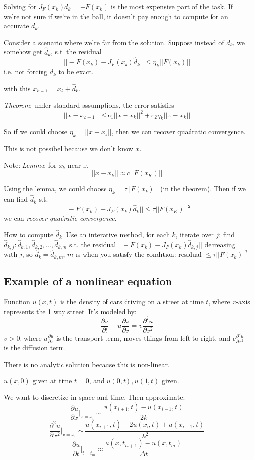 Solving for $J_F(x_k)d_k = -F(x_k)$ is the most expensive part of the
task. If we're not sure if we're in the ball, it doesn't pay enough to
compute for an accurate $d_k$.

Consider a scenario where we're far from the solution. Suppose instead
of $d_k$, we somehow get $\hat d_k$, s.t. the residual $$||-F(x_k) - J_F(x_k)\hat
d_k||\le \eta_k||F(x_k)||$$
i.e. not forcing $d_k$ to be exact.

with this $x_{k+1} = x_k + \hat d_k$,

\emph{Theorem}: under standard assumptions, the error satisfies
$$||x-x_{k+1}|| \le c_1||x-x_k||^2 + c_2\eta_k||x-x_k||$$

So if we could choose $\eta_k = ||x-x_k||$, then we can recover quadratic
convergence.

This is not possibel because we don't know $x$.

Note:
\emph{Lemma}: for $x_k$ near $x$, $$||x-x_k|| \approx c ||F(x_K)||$$

Using the lemma, we could choose $\eta_k = \tau ||F(x_k)||$ (in the
theorem). Then if we can find $\hat d_k$
s.t. $$||-F(x_k) - J_F(x_k)\hat d_k|| \le \tau||F(x_K)||^2$$
we can \emph{recover quadratic convergence}.

How to compute $\hat d_k$:
Use an interative method, for each $k$, iterate over $j$: find $\hat d_{k,j}:\hat d_{k,1}, \hat
d_{k,2}, \dots, \hat d_{k,m}$ s.t. the residual $||-F(x_k) -
J_F(x_k)\hat d_{k,j}||$ decreasing with $j$, so $\hat d_k = \hat
d_{k,m}$, $m$ is when you satisfy the condition: residual $\le \tau
||F(x_k)|^2$

\subsection{Example of a nonlinear equation}
Function $u(x,t)$ is the density of cars driving on a street at time
$t$, where $x$-axis represents the 1 way street.
It's modeled by: $$\frac{\partial u}{\partial t} + u\frac{\partial
  u}{\partial x} = v\frac{\partial^2 u}{\partial x^2}$$
$v>0$, where $u\frac{\partial u}{\partial x}$ is the transport term, moves
things from left to right, and $v\frac{\partial^2 u}{\partial x^2}$ is
the diffusion term.

There is no analytic solution because this is non-linear.

$u(x,0)$ given at time $t=0$, and $u(0,t), u(1,t)$ given.

We want to discretize in space and time. Then approximate:
$$\frac{\partial u}{\partial x}|_{x=x_i} \sim \frac{u(x_{i+1}, t) -
  u(x_{i-1},t)}{2k}$$
$$\frac{\partial^2 u}{\partial x^2}|_{x=x_i} \sim \frac{u(x_{i+1}, t)
  -2u(x_i,t) + u(x_{i-1},t)}{k^2}$$
$$\frac{\partial u}{\partial t}|_{t=t_m} \approx \frac{u(x, t_{m+1}) -
  u(x,t_m)}{\Delta t}$$

